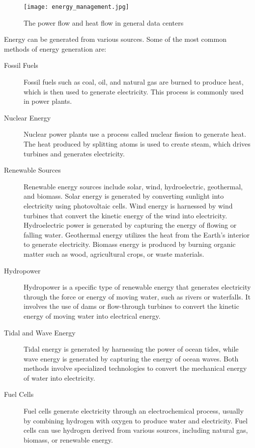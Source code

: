 \documentclass[
  a4paper,  %
  twoside,  %
  bibliography=totoc,
  headsepline,
  cleardoublepage=empty,
  parskip=half,
  draft=false
]{scrbook}
\begin{document}
\begin{figure}
	\centering
	\texttt{[image: energy\_management.jpg]}
	\caption{The power flow and heat flow in general data centers \cite{JIN2020114806}}
\end{figure}

Energy can be generated from various sources. Some of the most common methods of energy generation are:

\begin{description}
	\item[Fossil Fuels] Fossil fuels such as coal, oil, and natural gas are burned to produce heat, which is then used to generate electricity. This process is commonly used in power plants\cite{owid-fossil-fuels}.
	
	\item[Nuclear Energy] Nuclear power plants use a process called nuclear fission to generate heat. The heat produced by splitting atoms is used to create steam, which drives turbines and generates electricity\cite{ritchie2023nuclear}.
	
	\item[Renewable Sources] Renewable energy sources include solar, wind, hydroelectric, geothermal, and biomass. Solar energy is generated by converting sunlight into electricity using photovoltaic cells. Wind energy is harnessed by wind turbines that convert the kinetic energy of the wind into electricity. Hydroelectric power is generated by capturing the energy of flowing or falling water. Geothermal energy utilizes the heat from the Earth's interior to generate electricity. Biomass energy is produced by burning organic matter such as wood, agricultural crops, or waste materials\cite{owid-renewable-energy}.
	
	\item[Hydropower] Hydropower is a specific type of renewable energy that generates electricity through the force or energy of moving water, such as rivers or waterfalls. It involves the use of dams or flow-through turbines to convert the kinetic energy of moving water into electrical energy\cite{sipahutar2013renewable}.
	
	\item[Tidal and Wave Energy] Tidal energy is generated by harnessing the power of ocean tides, while wave energy is generated by capturing the energy of ocean waves. Both methods involve specialized technologies to convert the mechanical energy of water into electricity\cite{khan2017review}.
	
	\item[Fuel Cells] Fuel cells generate electricity through an electrochemical process, usually by combining hydrogen with oxygen to produce water and electricity. Fuel cells can use hydrogen derived from various sources, including natural gas, biomass, or renewable energy\cite{mekhilef2012comparative}.
\end{description}
\end{document}
